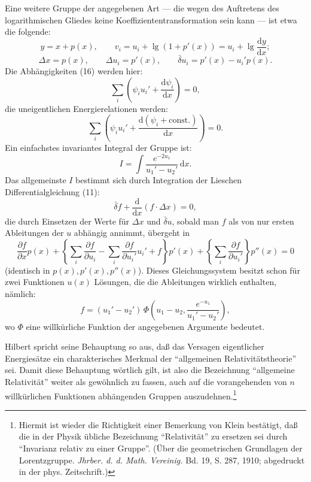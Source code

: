 \documentclass[11pt]{article}
\newcommand{\dd}{\mathrm d}
\newcommand{\D}{\Delta}
\newcommand{\bd}{\bar{\delta}}
\newcommand{\p}{\partial}
\begin{document}
Eine weitere Gruppe der angegebenen Art --- die wegen des Auftretens des logarithmischen Gliedes keine Koeffiziententransformation sein kann --- ist etwa die folgende:
\[
y=x+p(x),\qquad
v_i=u_i+\lg(1+p'(x))=u_i+\lg\frac{\dd y}{\dd x};
\]
\[
\D x=p(x),\qquad
\D u_i=p'(x),\qquad
\bd u_i=p'(x)-u_i'p(x).
\]
Die Abhängigkeiten (16) werden hier:
\[
\sum_i\left(\psi_i u_i'+\frac{\dd\psi_i}{\dd x}\right)=0,
\]
die uneigentlichen Energierelationen werden:
\[
\sum_i\left(\psi_i u_i'+
\frac{\dd(\psi_i+\mathrm{const.})}{\dd x}\right)=0.
\]
Ein einfachstes invariantes Integral der Gruppe ist:
\[
I=\int \frac{e^{-2u_1}}{u_1'-u_2'}\,\dd x.
\]
Das allgemeinste \(I\) bestimmt sich durch Integration der Lieschen Differentialgleichung (11):
\[
\bd f+\frac{\dd}{\dd x}(f\cdot \D x)=0,
\]
die durch Einsetzen der Werte für \(\D x\) und \(\bd u\), sobald man \(f\) als von nur ersten Ableitungen der \(u\) abhängig annimmt, übergeht in
\[
\frac{\p f}{\p x}p(x)
+\left\{\sum_i\frac{\p f}{\p u_i}
-\sum_i\frac{\p f}{\p u_i'}u_i'+f\right\}p'(x)
+\left\{\sum_i\frac{\p f}{\p u_i'}\right\}p''(x)=0
\]
(identisch in \(p(x),p'(x),p''(x)\)). Dieses Gleichungssystem besitzt schon für zwei Funktionen \(u(x)\) Lösungen, die die Ableitungen wirklich enthalten, nämlich:
\[
f=(u_1'-u_2')\,
\Phi\!\left(u_1-u_2,\frac{e^{-u_1}}{u_1'-u_2'}\right),
\]
wo \(\Phi\) eine willkürliche Funktion der angegebenen Argumente bedeutet.

Hilbert spricht seine Behauptung so aus, daß das Versagen eigentlicher Energiesätze ein charakterisches Merkmal der ``allgemeinen Relativitätstheorie'' sei. Damit diese Behauptung wörtlich gilt, ist also die Bezeichnung ``allgemeine Relativität'' weiter als gewöhnlich zu fassen, auch auf die vorangehenden von \(n\) willkürlichen Funktionen abhängenden Gruppen auszudehnen.\footnote{Hiermit ist wieder die Richtigkeit einer Bemerkung von Klein bestätigt, daß die in der Physik übliche Bezeichnung ``Relativität'' zu ersetzen sei durch ``Invarianz relativ zu einer Gruppe''. (Über die geometrischen Grundlagen der Lorentzgruppe. \emph{Jhrber. d. d. Math. Vereinig.} Bd. 19, S. 287, 1910; abgedruckt in der phys. Zeitschrift.)}
\end{document}
